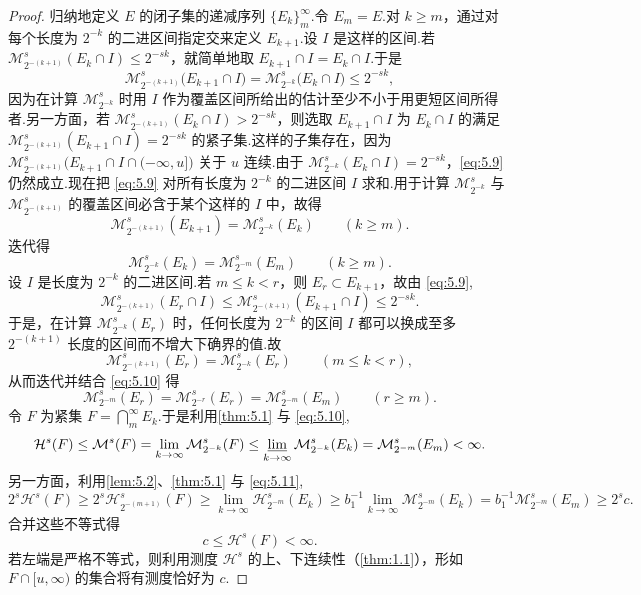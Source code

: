 \begin{proof}
归纳地定义 $E$ 的闭子集的递减序列 $\{E_k\}_{m}^{\infty}$.令 $E_m=E$.对 $k\geq m$，通过对每个长度为 $2^{-k}$ 的二进区间指定交来定义 $E_{k+1}$.设 $I$ 是这样的区间.若 $\mathcal{M}^{s}_{2^{-(k+1)}}(E_k\cap I)\leq 2^{-sk}$，就简单地取 $E_{k+1}\cap I=E_k\cap I$.于是
\begin{equation}\label{eq:5.9}
  \mathcal{M}^{s}_{2^{-(k+1)}}\bigl(E_{k+1}\cap I\bigr)=\mathcal{M}^{s}_{2^{-k}}\bigl(E_k\cap I\bigr)\leq 2^{-sk},
\end{equation}
因为在计算 $\mathcal{M}^s_{2^{-k}}$ 时用 $I$ 作为覆盖区间所给出的估计至少不小于用更短区间所得者.另一方面，若 $\mathcal{M}^{s}_{2^{-(k+1)}}(E_k\cap I)>2^{-sk}$，则选取 $E_{k+1}\cap I$ 为 $E_k\cap I$ 的满足 $\mathcal{M}^{s}_{2^{-(k+1)}}(E_{k+1}\cap I)=2^{-sk}$ 的紧子集.这样的子集存在，因为 $\mathcal{M}^{s}_{2^{-(k+1)}}\bigl(E_{k+1}\cap I\cap(-\infty,u]\bigr)$ 关于 $u$ 连续.由于 $\mathcal{M}^{s}_{2^{-k}}(E_k\cap I)=2^{-sk}$，\eqref{eq:5.9} 仍然成立.现在把 \eqref{eq:5.9} 对所有长度为 $2^{-k}$ 的二进区间 $I$ 求和.用于计算 $\mathcal{M}^s_{2^{-k}}$ 与 $\mathcal{M}^s_{2^{-(k+1)}}$ 的覆盖区间必含于某个这样的 $I$ 中，故得
\[
  \mathcal{M}^{s}_{2^{-(k+1)}}(E_{k+1})=\mathcal{M}^{s}_{2^{-k}}(E_k)\qquad(k\geq m).
\]
迭代得
\begin{equation}\label{eq:5.10}
  \mathcal{M}^{s}_{2^{-k}}(E_k)=\mathcal{M}^{s}_{2^{-m}}(E_m)\qquad(k\geq m).
\end{equation}
设 $I$ 是长度为 $2^{-k}$ 的二进区间.若 $m\leq k<r$，则 $E_r\subset E_{k+1}$，故由 \eqref{eq:5.9},
\[
  \mathcal{M}^{s}_{2^{-(k+1)}}(E_r\cap I)\leq\mathcal{M}^{s}_{2^{-(k+1)}}(E_{k+1}\cap I)\leq 2^{-sk}.
\]
于是，在计算 $\mathcal{M}^s_{2^{-k}}(E_r)$ 时，任何长度为 $2^{-k}$ 的区间 $I$ 都可以换成至多 $2^{-(k+1)}$ 长度的区间而不增大下确界的值.故
\[
  \mathcal{M}^{s}_{2^{-(k+1)}}(E_r)=\mathcal{M}^{s}_{2^{-k}}(E_r)\qquad(m\leq k<r),
\]
从而迭代并结合 \eqref{eq:5.10} 得
\begin{equation}\label{eq:5.11}
  \mathcal{M}^{s}_{2^{-m}}(E_r)=\mathcal{M}^{s}_{2^{-r}}(E_r)=\mathcal{M}^{s}_{2^{-m}}(E_m)\qquad(r\geq m).
\end{equation}
令 $F$ 为紧集 $F=\bigcap_{m}^{\infty}E_k$.于是利用\cref{thm:5.1} 与 \eqref{eq:5.10},
\begin{equation}\label{eq:5.12}
  \mathcal{H}^{s}(F)\leq\mathcal{M}^{s}(F)=\lim_{k\to\infty}\mathcal{M}^{s}_{2^{-k}}(F)
  \leq\varliminf_{k\to\infty}\mathcal{M}^{s}_{2^{-k}}(E_k)=\mathcal{M}^{s}_{2^{-m}}(E_m)<\infty.
\end{equation}
另一方面，利用\cref{lem:5.2}、\cref{thm:5.1} 与 \eqref{eq:5.11},
\[
  2^{s}\mathcal{H}^{s}(F)\geq 2^{s}\mathcal{H}^{s}_{2^{-(m+1)}}(F)\geq\lim_{k\to\infty}\mathcal{H}^{s}_{2^{-m}}(E_k)
  \geq b_1^{-1}\lim_{k\to\infty}\mathcal{M}^{s}_{2^{-m}}(E_k)
  =b_1^{-1}\mathcal{M}^{s}_{2^{-m}}(E_m)\geq 2^{s}c.
\]
合并这些不等式得
\[
  c\leq\mathcal{H}^{s}(F)<\infty.
\]
若左端是严格不等式，则利用测度 $\mathcal{H}^s$ 的上、下连续性（\cref{thm:1.1}），形如 $F\cap[u,\infty)$ 的集合将有测度恰好为 $c$.


\end{proof}
